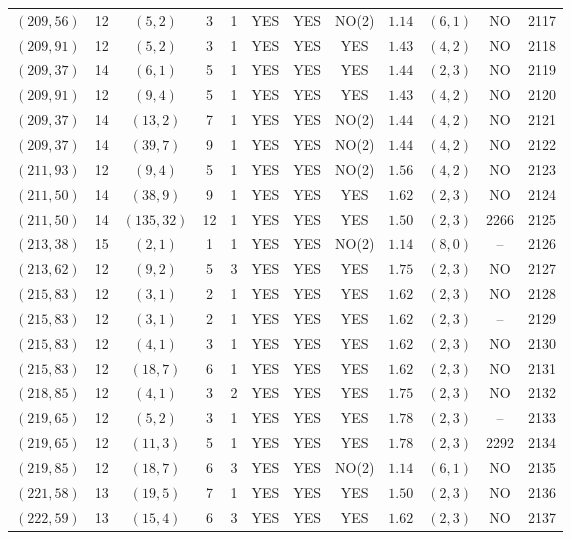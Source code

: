 \begin{longtable}{|c|c|c|c|c|c|c|c|c|c|c|c|}
$(209,56)$ & 12 & $(5,2)$ & 3 & 1 & YES & YES & NO(2) & $1.14$ & $(6,1)$ & NO & 2117\\
$(209,91)$ & 12 & $(5,2)$ & 3 & 1 & YES & YES & YES & $1.43$ & $(4,2)$ & NO & 2118\\
$(209,37)$ & 14 & $(6,1)$ & 5 & 1 & YES & YES & YES & $1.44$ & $(2,3)$ & NO & 2119\\
$(209,91)$ & 12 & $(9,4)$ & 5 & 1 & YES & YES & YES & $1.43$ & $(4,2)$ & NO & 2120\\
$(209,37)$ & 14 & $(13,2)$ & 7 & 1 & YES & YES & NO(2) & $1.44$ & $(4,2)$ & NO & 2121\\
$(209,37)$ & 14 & $(39,7)$ & 9 & 1 & YES & YES & NO(2) & $1.44$ & $(4,2)$ & NO & 2122\\
$(211,93)$ & 12 & $(9,4)$ & 5 & 1 & YES & YES & NO(2) & $1.56$ & $(4,2)$ & NO & 2123\\
$(211,50)$ & 14 & $(38,9)$ & 9 & 1 & YES & YES & YES & $1.62$ & $(2,3)$ & NO & 2124\\
$(211,50)$ & 14 & $(135,32)$ & 12 & 1 & YES & YES & YES & $1.50$ & $(2,3)$ & 2266 & 2125\\
$(213,38)$ & 15 & $(2,1)$ & 1 & 1 & YES & YES & NO(2) & $1.14$ & $(8,0)$ & -- & 2126\\
$(213,62)$ & 12 & $(9,2)$ & 5 & 3 & YES & YES & YES & $1.75$ & $(2,3)$ & NO & 2127\\
$(215,83)$ & 12 & $(3,1)$ & 2 & 1 & YES & YES & YES & $1.62$ & $(2,3)$ & NO & 2128\\
$(215,83)$ & 12 & $(3,1)$ & 2 & 1 & YES & YES & YES & $1.62$ & $(2,3)$ & -- & 2129\\
$(215,83)$ & 12 & $(4,1)$ & 3 & 1 & YES & YES & YES & $1.62$ & $(2,3)$ & NO & 2130\\
$(215,83)$ & 12 & $(18,7)$ & 6 & 1 & YES & YES & YES & $1.62$ & $(2,3)$ & NO & 2131\\
$(218,85)$ & 12 & $(4,1)$ & 3 & 2 & YES & YES & YES & $1.75$ & $(2,3)$ & NO & 2132\\
$(219,65)$ & 12 & $(5,2)$ & 3 & 1 & YES & YES & YES & $1.78$ & $(2,3)$ & -- & 2133\\
$(219,65)$ & 12 & $(11,3)$ & 5 & 1 & YES & YES & YES & $1.78$ & $(2,3)$ & 2292 & 2134\\
$(219,85)$ & 12 & $(18,7)$ & 6 & 3 & YES & YES & NO(2) & $1.14$ & $(6,1)$ & NO & 2135\\
$(221,58)$ & 13 & $(19,5)$ & 7 & 1 & YES & YES & YES & $1.50$ & $(2,3)$ & NO & 2136\\
$(222,59)$ & 13 & $(15,4)$ & 6 & 3 & YES & YES & YES & $1.62$ & $(2,3)$ & NO & 2137\\

\end{longtable}
